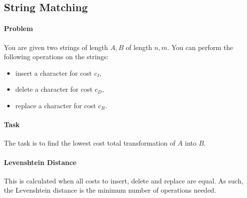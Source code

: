 \subsection{String Matching}

\paragraph{Problem}
You are given two strings of length  \(A, B\) of length  \(n, m\).
You can perform the following operations on the strings:
\begin{itemize}
  \item insert a character for cost \(c_I\),
  \item delete a character for cost \(c_D\),
  \item replace a character for cost \(c_R\).
\end{itemize}

\paragraph{Task}
The task is to find the lowest cost total transformation of \(A\) into  \(B\).

\paragraph{Levenshtein Distance}
This is calculated when all costs to insert, delete and replace are equal.
As such, the Levenshtein distance is the minimum number of operations needed.




